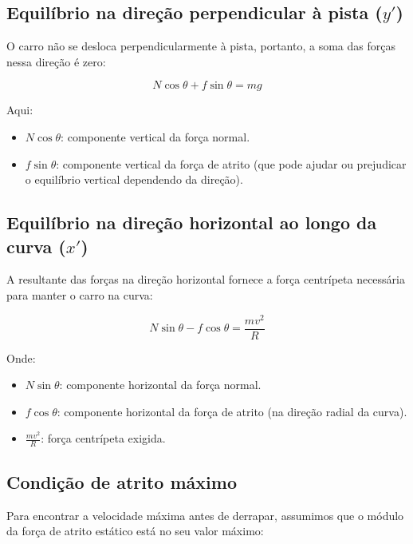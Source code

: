 \documentclass[a4paper,12pt]{article}
\begin{document}
\begin{flushleft}
\subsection*{Equilíbrio na direção perpendicular à pista (\( y' \))}

O carro não se desloca perpendicularmente à pista, portanto, a soma das forças nessa direção é zero:

\begin{equation}
N \cos\theta + f \sin\theta = mg
\label{eq:equilibrio_y}
\end{equation}

Aqui:

\begin{itemize}
  \item \( N \cos\theta \): componente vertical da força normal.
  \item \( f \sin\theta \): componente vertical da força de atrito (que pode ajudar ou prejudicar o equilíbrio vertical dependendo da direção).
\end{itemize}

\subsection*{Equilíbrio na direção horizontal ao longo da curva (\( x' \))}

A resultante das forças na direção horizontal fornece a força centrípeta necessária para manter o carro na curva:

\begin{equation}
N \sin\theta - f \cos\theta = \frac{mv^2}{R}
\label{eq:equilibrio_x}
\end{equation}

Onde:

\begin{itemize}
  \item \( N \sin\theta \): componente horizontal da força normal.
  \item \( f \cos\theta \): componente horizontal da força de atrito (na direção radial da curva).
  \item \( \frac{mv^2}{R} \): força centrípeta exigida.
\end{itemize}

\subsection*{Condição de atrito máximo}

Para encontrar a velocidade máxima antes de derrapar, assumimos que o módulo da força de atrito estático está no seu valor máximo:


\end{flushleft}
\end{document}
